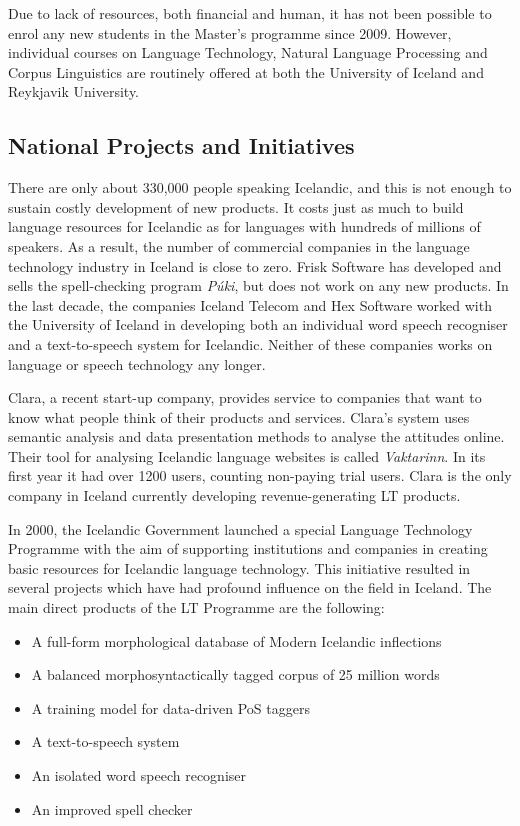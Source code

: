 \documentclass{../../metanetpaper}
\begin{document}
\begin{multicols}{2}
Due to lack of resources, both financial and human, it has not been possible to enrol any new students in the Master’s programme since 2009. However, individual courses on Language Technology, Natural Language Processing and Corpus Linguistics are routinely offered at both the University of Iceland and Reykjavik University.

\subsection{National Projects and Initiatives}

There are only about 330,000 people speaking Icelandic, and this is not enough to sustain costly development of new products. It costs just as much to build language resources for Icelandic as for languages with hundreds of millions of speakers. As a result, the number of commercial companies in the language technology industry in Iceland is close to zero. Frisk Software has developed and sells the spell-checking program \textit{Púki}, but does not work on any new products. In the last decade, the companies Iceland Telecom and Hex Software worked with the University of Iceland in developing both an individual word speech recogniser and a text-to-speech system for Icelandic. Neither of these companies works on language or speech technology any longer.

Clara, a recent start-up company, provides service to companies that want to know what people think of their products and services. Clara’s system uses semantic analysis and data presentation methods to analyse the attitudes online. Their tool for analysing Icelandic language websites is called \textit{Vaktarinn}\cite{vak1}.  In its first year it had over 1200 users, counting non-paying trial users. Clara is the only company in Iceland currently developing revenue-generating LT products.

In 2000, the Icelandic Government launched a special Language Technology Programme with the aim of supporting institutions and companies in creating basic resources for Icelandic language technology. This initiative resulted in several projects which have had profound influence on the field in Iceland. The main direct products of the LT Programme are the following\cite{ilrt1}: 

\begin{itemize}
\item A full-form morphological database of Modern Icelandic inflections
\item A balanced morphosyntactically tagged corpus of 25 million words
\item A training model for data-driven PoS taggers
\item A text-to-speech system
\item An isolated word speech recogniser
\item An improved spell checker
\end{itemize}


\end{multicols}
\end{document}
